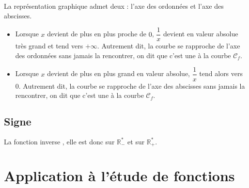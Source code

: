 \documentclass[french]{book}
\begin{document}
\begin{rem}

La représentation graphique admet deux : l'axe des ordonnées et l'axe des abscisses. 

\begin{itemize}
\item Lorsque $x$ devient de plus en plus proche de $0$,  $\dfrac{1}{x}$ devient en valeur absolue très grand et tend vers $+\infty$. Autrement dit, la courbe se rapproche de l'axe des ordonnées sans jamais la rencontrer, on dit que c'est une   à la courbe $\mathcal{C}_f$.
\item Lorsque $x$ devient de plus en plus grand en valeur absolue, $\dfrac{1}{x}$ tend alors vers $0$. Autrement dit, la courbe se rapproche de l'axe des abscisses sans jamais la rencontrer, on dit que c'est une  à la courbe $\mathcal{C}_f$.
\end{itemize}
\end{rem}

\subsection{Signe}

\begin{prop}
La fonction inverse , elle est donc  sur $\mathbb{R}_-^*$ et  sur $\mathbb{R}_+^*$.
\end{prop}

\section{Application à l'étude de fonctions}

%
%
\end{document}
